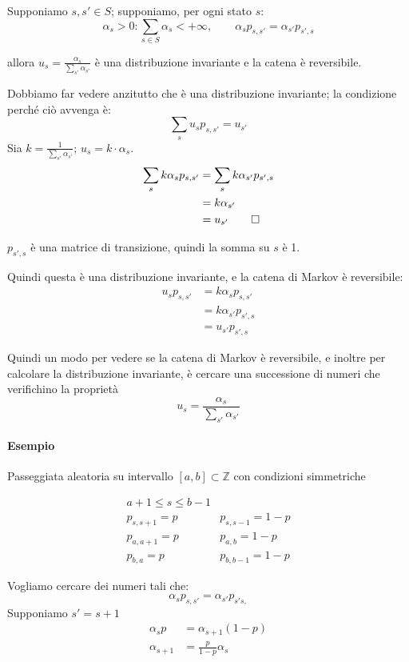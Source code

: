 \documentclass[a4paper,12pt]{book}
\begin{document}
Supponiamo $ s,s' \in S $; supponiamo, per ogni stato $ s $:
$$ \alpha_s > 0 : \sum_{s \in S} \alpha_s < + \infty, \qquad \alpha_s p_{s,s'} = \alpha_{s'}p_{s',s} $$ 

allora $ u_s = \frac{\alpha_{s}}{\sum_{s'} \alpha_{s'}} $ è una distribuzione invariante e la catena è reversibile. 

Dobbiamo far vedere anzitutto che è una distribuzione invariante; la condizione perché ciò avvenga è:
$$ \sum_{s} u_s p_{s,s'} = u_{s'} $$
Sia $ k = \frac{1}{\sum_{s'}\alpha_{s'}} $; $ u_s = k \cdot \alpha_s $.
\begin{align*}
	\sum_{s} k\alpha_{s} p_{s,s'} & = \sum_{s} k \alpha_{s'} p_{s',s} \\
	& = k \alpha_{s'} \\ 
	& = u_{s'} \qed
\end{align*}

$ p_{s',s} $ è una matrice di transizione, quindi la somma su $ s $ è 1. 

Quindi questa è una distribuzione invariante, e la catena di Markov è reversibile: 
\begin{align*}
u_s p_{s,s'} & = k \alpha_{s} p_{s,s'} \\
	& = k\alpha_{s'} p_{s',s} \\
	& = u_{s'} p_{s',s} 
\end{align*}

Quindi un modo per vedere se la catena di Markov è reversibile, e inoltre per calcolare la distribuzione invariante, è cercare una successione di numeri che verifichino la proprietà 
$$ u_s = \frac{\alpha_{s}}{\sum_{s'} \alpha_{s'}} $$

\paragraph{Esempio} Passeggiata aleatoria su intervallo $ [a, b] \subset \mathbb{Z} $ con condizioni simmetriche

$$ \begin{array}{cc}
	a+1 \le s \le b-1 & \\
	p_{s,s+1} = p & p_{s,s-1} = 1-p \\
	p_{a,a+1} = p & p_{a,b} = 1-p \\
	p_{b,a} = p & p_{b,b-1} = 1-p
\end{array}$$

Vogliamo cercare dei numeri tali che:
	$$ \alpha_{s}p_{s,s'} = \alpha_{s'} p_{s's,} $$
Supponiamo $ s' = s+1 $
\begin{align*}
	\alpha_{s} p & = \alpha_{s+1} (1-p) \\
	\alpha_{s+1} & = \frac{p}{1-p} \alpha_{s}
\end{align*}
\end{document}
